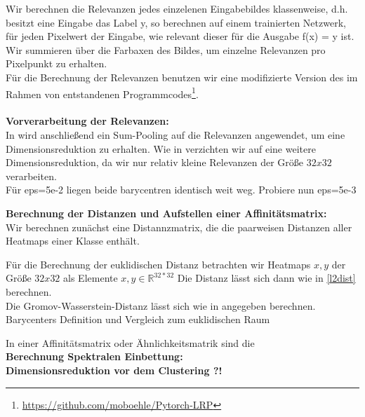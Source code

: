 \documentclass[11pt,a4paper]{article}
\numberwithin{equation}{section}
\begin{document}
	\noindent Wir berechnen die Relevanzen jedes einzelenen Eingabebildes klassenweise, d.h. besitzt eine Eingabe das Label y, so berechnen auf einem trainierten Netzwerk, für jeden Pixelwert der Eingabe, wie relevant dieser für die Ausgabe f(x) = y ist.\\
	Wir summieren über die Farbaxen des Bildes, um einzelne Relevanzen pro Pixelpunkt zu erhalten.\\
	Für die Berechnung der Relevanzen benutzen wir eine modifizierte Version des im Rahmen von \cite{lrp_alzheimer} entstandenen Programmcodes\footnote{\url{https://github.com/moboehle/Pytorch-LRP}}.\\
	\\
	\noindent \textbf{Vorverarbeitung der Relevanzen:}\\
	In \cite{unmaskingCH} wird anschließend ein Sum-Pooling auf die Relevanzen angewendet, um eine Dimensionsreduktion zu erhalten. Wie in \cite{imagenet_unhansed_v1} verzichten wir auf eine weitere Dimensionsreduktion, da wir nur relativ kleine Relevanzen der Größe $32x32$ verarbeiten.	\\
	
	Für eps=5e-2 liegen beide barycentren identisch weit weg. Probiere nun eps=5e-3
	
	\noindent \textbf{Berechnung der Distanzen und Aufstellen einer Affinitätsmatrix:}\\
	
	Wir berechnen zunächst eine Distannzmatrix, die die paarweisen Distanzen aller Heatmaps einer Klasse enthält.	
	
	Für die Berechnung der euklidischen Distanz betrachten wir Heatmaps $x,y$ der Größe $32x32$ als Elemente $x,y \in \mathbb{R}^{32*32}$ Die Distanz lässt sich dann wie in \autoref{l2dist} berechnen.\\
	
	Die Gromov-Wasserstein-Distanz lässt sich wie in \cite{gwd_averaging_kernels} angegeben berechnen. \\
	
	Barycenters Definition und Vergleich zum euklidischen Raum \cite{bary_wasserstein_space}
	
	In einer Affinitätsmatrix oder Ähnlichkeitsmatrik sind die \\
	
	\noindent \textbf{Berechnung Spektralen Einbettung:}\\
	
	\noindent \textbf{Dimensionsreduktion vor dem Clustering ?!}\\
	
\end{document}
